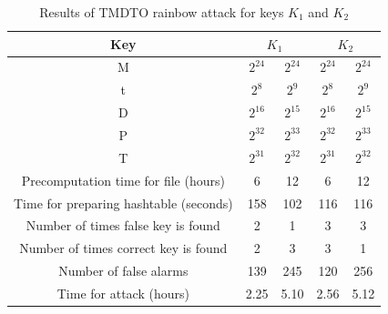 \begin{table}[ht!]
\begin{center}
\begin{tabular}{|c||c|c||c|c|}
\hline
Key & \multicolumn{2}{c||}{\textbf{$K_1$}} & \multicolumn{2}{c|}{\textbf{$K_2$}} \\ \hline \hline
M																				&	$2^{24}$ 	&	$2^{24}$ 	&	$2^{24}$ 	&	$2^{24}$ 	\\ 
t	  																		&	$2^{8}$ 	&	$2^{9}$ 	&	$2^{8}$ 	&	$2^{9}$		\\ 
D	  																		&	$2^{16}$ 	&	$2^{15}$ 	&	$2^{16}$ 	&	$2^{15}$	\\ \hline \hline
P	  																		&	$2^{32}$ 	&	$2^{33}$ 	&	$2^{32}$ 	&	$2^{33}$	\\ \hline
T	  																		&	$2^{31}$ 	&	$2^{32}$ 	&	$2^{31}$ 	&	$2^{32}$	\\ \hline
Precomputation time for file (hours)		&	6 	 			&	12 				&	6					&	12 				\\ \hline
Time for preparing hashtable (seconds)	&	158				&	102				& 116				&	116				\\ \hline
Number of times false key is found			&	2 				&	1 				&	3 				&	3 				\\ \hline
Number of times correct key is found 		&	2 				&	3					&	3 				&	1 				\\ \hline
Number of false alarms									&	139				&	245				&	120				&	256				\\ \hline
Time for attack	(hours)									&	2.25 			&	5.10			&	2.56 		 	&	5.12 			\\ \hline
\end{tabular}
\end{center}
\caption{Results of TMDTO rainbow attack for keys $K_1$ and $K_2$}
\label{tab:rainbow-attack-results}
\end{table}

